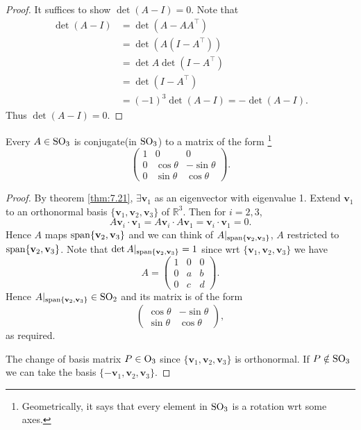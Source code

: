 \documentclass[a4paper]{article}
\begin{document}
\begin{proof}
  It suffices to show $ \det (A-I)=0 $. Note that
  \begin{align*}
    \det (A-I)&= \det (A-A A^\top)\\
    &= \det (A(I-A^\top))\\
    &= \det A \det (I-A^\top)\\
    &= \det (I-A^\top)\\
    &= (-1)^3\det(A-I)=-\det (A-I).
  \end{align*}
  Thus $ \det (A-I)=0 $.
\end{proof}
\begin{corollary}\label{col:7.22}
  Every $ A\in \mathrm{SO}_3 $ is conjugate(in $ \mathrm{SO}_3 $) to a matrix of the
  form \footnote{Geometrically, it says that every element in $ \mathrm{SO}_3
  $ is a rotation wrt some axes.}
  \[
    \begin{pmatrix}
      1&0&0\\
      0&\cos \theta& -\sin \theta\\
      0&\sin \theta& \cos \theta
    \end{pmatrix}.
  \]
\end{corollary}
\begin{proof}
  By theorem \ref{thm:7.21}, $ \exists \mathbf{v}_1 $ as an
  eigenvector with eigenvalue 1. Extend $\mathbf{v}_1$ to an
  orthonormal basis $ \{\mathbf{v}_1,\mathbf{v}_2,\mathbf{v}_3\} $ of
  $ \mathbb{R}^{3} $. Then for $i=2,3$,
  \[
    A\mathbf{v}_i \cdot \mathbf{v}_1 = A\mathbf{v}_i \cdot
    A\mathbf{v}_1 = \mathbf{v}_i \cdot \mathbf{v}_1 = 0.
  \]
  Hence $ A $ maps $ \operatorname{span}\{\mathbf{v}_2,\mathbf{v}_3\} $ and we can
  think of $A|_{\operatorname{span}\{\mathbf{v}_2,\mathbf{v}_3\}}$, $A$ restricted
  to $\operatorname{span}\{\mathbf{v}_2,\mathbf{v}_3\}$. Note that $\det
  A|_{\operatorname{span}\{\mathbf{v}_2,\mathbf{v}_3\}}=1$ since wrt
  $\{\mathbf{v}_1,\mathbf{v}_2,\mathbf{v}_3\}$ we have
  \[
    A=
    \begin{pmatrix}
      1&0&0\\
      0&a& b\\
      0&c& d
    \end{pmatrix}.
  \]
  Hence $A|_{\operatorname{span}\{\mathbf{v}_2,\mathbf{v}_3\}}\in \mathrm{SO}_2$ and its
  matrix is of the form
  \[
    \begin{pmatrix}
      \cos \theta& -\sin \theta\\
      \sin \theta& \cos \theta
    \end{pmatrix},
  \]
  as required.

  The change of basis matrix $P\in \mathrm{O}_3$ since
  $\{\mathbf{v}_1,\mathbf{v}_2,\mathbf{v}_3\}$ is orthonormal. If
  $P\notin \mathrm{SO}_3$ we can take the basis $
  \{-\mathbf{v}_1,\mathbf{v}_2,\mathbf{v}_3\} $.
\end{proof}
\end{document}
